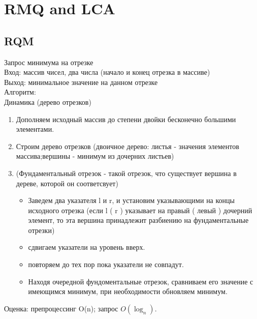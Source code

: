 \documentclass[a4paper]{article}
\begin{document}
\section{RMQ and LCA}
\subsection{RQM}
Запрос минимума на отрезке \\
Вход: массив чисел, два числа (начало и конец отрезка в массиве) \\
Выход: минимальное значение на данном отрезке\\
Алгоритм:\\
Динамика (дерево отрезков)
\begin{enumerate}
	\item Дополняем исходный массив до степени двойки бесконечно большими элементами.
	\item  Строим дерево отрезков (двоичное дерево: листья - значения элементов массива;вершины - минимум из дочерних листьев)
	\item (Фундаментальный отрезок - такой отрезок, что существует вершина в дереве, которой он соответсвует) 
	\begin{itemize}
		\item Заведем два указателя l и r, и установим указывающими на концы исходного отрезка (если l ( r ) указывает на правый ( левый ) дочерний элемент, то эта вершина принадлежит разбиению на фундаментальные отрезки)
		\item сдвигаем указатели на уровень вверх.
		\item повторяем до тех пор пока указатели не совпадут.
		\item Находя очередной фундоментальные отрезок, сравниваем его значение с имеющимся минимум, при необходимости обновляем минимум.
	\end{itemize}  
\end{enumerate}
Оценка: препроцессинг O(n); запрос $O(\log_n)$.
\end{document}
